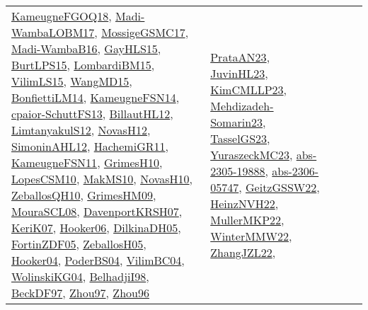 {\begin{longtable}{lp{3cm}>{\raggedright}p{6cm}>{\raggedright}p{6cm}p{8cm}}
\href{papers/KameugneFGOQ18.pdf}{KameugneFGOQ18}\cite{KameugneFGOQ18}, \href{papers/Madi-WambaLOBM17.pdf}{Madi-WambaLOBM17}\cite{Madi-WambaLOBM17}, \href{papers/MossigeGSMC17.pdf}{MossigeGSMC17}\cite{MossigeGSMC17}, \href{papers/Madi-WambaB16.pdf}{Madi-WambaB16}\cite{Madi-WambaB16}, \href{papers/GayHLS15.pdf}{GayHLS15}\cite{GayHLS15}, \href{papers/BurtLPS15.pdf}{BurtLPS15}\cite{BurtLPS15}, \href{papers/LombardiBM15.pdf}{LombardiBM15}\cite{LombardiBM15}, \href{papers/VilimLS15.pdf}{VilimLS15}\cite{VilimLS15}, \href{articles/WangMD15.pdf}{WangMD15}\cite{WangMD15}, \href{papers/BonfiettiLM14.pdf}{BonfiettiLM14}\cite{BonfiettiLM14}, \href{articles/KameugneFSN14.pdf}{KameugneFSN14}\cite{KameugneFSN14}, \href{papers/cpaior-SchuttFS13.pdf}{cpaior-SchuttFS13}\cite{cpaior-SchuttFS13}, \href{papers/BillautHL12.pdf}{BillautHL12}\cite{BillautHL12}, \href{articles/LimtanyakulS12.pdf}{LimtanyakulS12}\cite{LimtanyakulS12}, \href{articles/NovasH12.pdf}{NovasH12}\cite{NovasH12}, \href{papers/SimoninAHL12.pdf}{SimoninAHL12}\cite{SimoninAHL12}, \href{articles/HachemiGR11.pdf}{HachemiGR11}\cite{HachemiGR11}, \href{papers/KameugneFSN11.pdf}{KameugneFSN11}\cite{KameugneFSN11}, \href{papers/GrimesH10.pdf}{GrimesH10}\cite{GrimesH10}, \href{articles/LopesCSM10.pdf}{LopesCSM10}\cite{LopesCSM10}, \href{papers/MakMS10.pdf}{MakMS10}\cite{MakMS10}, \href{articles/NovasH10.pdf}{NovasH10}\cite{NovasH10}, \href{articles/ZeballosQH10.pdf}{ZeballosQH10}\cite{ZeballosQH10}, \href{papers/GrimesHM09.pdf}{GrimesHM09}\cite{GrimesHM09}, \href{papers/MouraSCL08.pdf}{MouraSCL08}\cite{MouraSCL08}, \href{papers/DavenportKRSH07.pdf}{DavenportKRSH07}\cite{DavenportKRSH07}, \href{papers/KeriK07.pdf}{KeriK07}\cite{KeriK07}, \href{articles/Hooker06.pdf}{Hooker06}\cite{Hooker06}, \href{papers/DilkinaDH05.pdf}{DilkinaDH05}\cite{DilkinaDH05}, \href{papers/FortinZDF05.pdf}{FortinZDF05}\cite{FortinZDF05}, \href{articles/ZeballosH05.pdf}{ZeballosH05}\cite{ZeballosH05}, \href{papers/Hooker04.pdf}{Hooker04}\cite{Hooker04}, \href{articles/PoderBS04.pdf}{PoderBS04}\cite{PoderBS04}, \href{papers/VilimBC04.pdf}{VilimBC04}\cite{VilimBC04}, \href{papers/WolinskiKG04.pdf}{WolinskiKG04}\cite{WolinskiKG04}, \href{articles/BelhadjiI98.pdf}{BelhadjiI98}\cite{BelhadjiI98}, \href{papers/BeckDF97.pdf}{BeckDF97}\cite{BeckDF97}, \href{articles/Zhou97.pdf}{Zhou97}\cite{Zhou97}, \href{papers/Zhou96.pdf}{Zhou96}\cite{Zhou96} & \href{articles/PrataAN23.pdf}{PrataAN23}\cite{PrataAN23}, \href{papers/JuvinHL23.pdf}{JuvinHL23}\cite{JuvinHL23}, \href{papers/KimCMLLP23.pdf}{KimCMLLP23}\cite{KimCMLLP23}, \href{papers/Mehdizadeh-Somarin23.pdf}{Mehdizadeh-Somarin23}\cite{Mehdizadeh-Somarin23}, \href{papers/TasselGS23.pdf}{TasselGS23}\cite{TasselGS23}, \href{papers/YuraszeckMC23.pdf}{YuraszeckMC23}\cite{YuraszeckMC23}, \href{articles/abs-2305-19888.pdf}{abs-2305-19888}\cite{abs-2305-19888}, \href{articles/abs-2306-05747.pdf}{abs-2306-05747}\cite{abs-2306-05747}, \href{papers/GeitzGSSW22.pdf}{GeitzGSSW22}\cite{GeitzGSSW22}, \href{articles/HeinzNVH22.pdf}{HeinzNVH22}\cite{HeinzNVH22}, \href{articles/MullerMKP22.pdf}{MullerMKP22}\cite{MullerMKP22}, \href{papers/WinterMMW22.pdf}{WinterMMW22}\cite{WinterMMW22}, \href{papers/ZhangJZL22.pdf}{ZhangJZL22}\cite{ZhangJZL22}, 
\end{longtable}}

